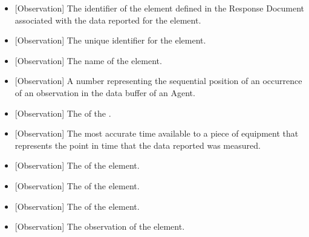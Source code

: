 \begin{itemize}

\item {}[Observation] \newline The identifier of the  element defined in the  \gls{Response Document} associated with the data reported for the  element.

\item {}[Observation] \newline The unique identifier for the  element.

\item {}[Observation] \newline The name of the  element.

\item {}[Observation] \newline A number representing the sequential position of an occurrence of an \gls{observation} in the data buffer of an \gls{Agent}.

\item {}[Observation] \newline The  of the .

\item {}[Observation] \newline The most accurate time available to a piece of equipment that represents the point in time that the data reported was measured.

\item {}[Observation] \newline The  of the  element.

\item {}[Observation] \newline The  of the  element.

\item {}[Observation] \newline The  of the  element.

\item {}[Observation] \newline The \gls{observation} of the  element.
\end{itemize}

